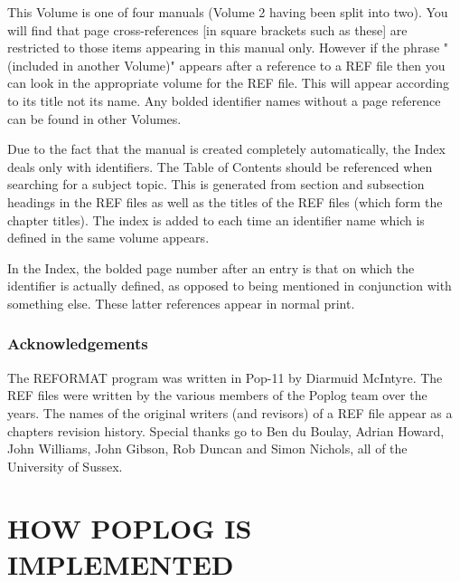 This Volume is one of four manuals (Volume 2 having been split into
two). You will find that page cross-references [in square brackets such
as these] are restricted to those items appearing in this manual only.
However if the phrase "(included in another Volume)" appears after a
reference to a REF file then you can look in the appropriate volume for
the REF file. This will appear according to its title not its name.
	Any bolded identifier names without a page reference can be found in
other Volumes.


Due to the fact that the manual is created completely automatically, the
Index deals only with identifiers. The Table of Contents should be
referenced when searching for a subject topic. This is generated from
section and subsection headings in the REF files as well as the titles
of the REF files (which form the chapter titles). The index is added to each
time an identifier name which is defined in the same volume appears.

	 In the Index, the bolded page number after an entry is that on
which the identifier is actually defined, as opposed to being mentioned
in conjunction with something else. These latter references appear in
normal print.


\section*{Acknowledgements}

The REFORMAT program was written in Pop-11 by Diarmuid McIntyre. The REF
files were written by the various members of the Poplog team over the
years. The names of the original writers (and revisors) of a REF file
appear as a chapters revision history. Special thanks go to Ben du
Boulay, Adrian Howard, John Williams, John Gibson, Rob Duncan and Simon
Nichols, all of the University of Sussex.



\tableofcontents






\part{HOW POPLOG IS IMPLEMENTED}


